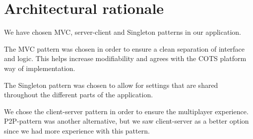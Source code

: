 \section{Architectural rationale}
\label{sec:architecturalrationale}

We have chosen MVC, server-client and Singleton patterns in our application.

The MVC pattern was chosen in order to ensure a clean separation of interface
and logic. This helps increase modifiability and agrees with the COTS platform
way of implementation.

The Singleton pattern was chosen to allow for settings that are shared
throughout the different parts of the application.

We chose the client-server pattern in order to ensure the multiplayer
experience. P2P-pattern was another alternative, but we saw client-server as a
better option since we had more experience with this pattern.
